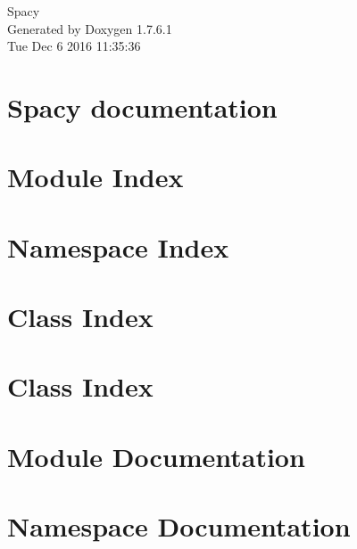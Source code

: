 \documentclass[a4paper]{book}
\begin{document}
\hypersetup{pageanchor=false,citecolor=blue}
\begin{titlepage}
\vspace*{7cm}
\begin{center}
{\Large \-Spacy }\\
\vspace*{1cm}
{\large \-Generated by Doxygen 1.7.6.1}\\
\vspace*{0.5cm}
{\small Tue Dec 6 2016 11:35:36}\\
\end{center}
\end{titlepage}
\clearemptydoublepage
{}
\tableofcontents
\clearemptydoublepage
{}
\hypersetup{pageanchor=true,citecolor=blue}
\chapter{\-Spacy documentation}
\label{index}\hypertarget{index}{}
\chapter{\-Module \-Index}

\chapter{\-Namespace \-Index}

\chapter{\-Class \-Index}

\chapter{\-Class \-Index}

\chapter{\-Module \-Documentation}













\chapter{\-Namespace \-Documentation}

















\end{document}
